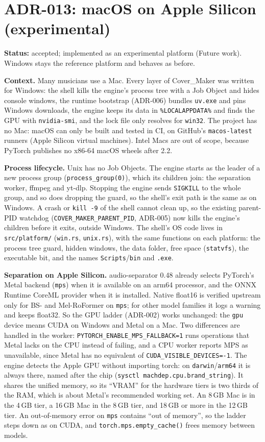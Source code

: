 \section{ADR-013: macOS on Apple Silicon (experimental)}
\textbf{Status:} accepted; implemented as an experimental platform (Future
work). Windows stays the reference platform and behaves as before.

\textbf{Context.} Many musicians use a Mac. Every layer of Cover\_Maker was
written for Windows: the shell kills the engine's process tree with a Job
Object and hides console windows, the runtime bootstrap (ADR-006) bundles
\texttt{uv.exe} and pins Windows downloads, the engine keeps its data in
\texttt{\%LOCALAPPDATA\%} and finds the GPU with \texttt{nvidia-smi}, and the
lock file only resolves for \texttt{win32}. The project has no Mac: macOS can
only be built and tested in CI, on GitHub's \texttt{macos-latest} runners
(Apple Silicon virtual machines). Intel Macs are out of scope, because
PyTorch publishes no x86-64 macOS wheels after 2.2.

\textbf{Process lifecycle.} Unix has no Job Objects. The engine starts as
the leader of a new process group (\texttt{process\_group(0)}), which its
children join: the separation worker, ffmpeg and yt-dlp. Stopping the engine
sends \texttt{SIGKILL} to the whole group, and so does dropping the guard,
so the shell's exit path is the same as on Windows. A crash or
\texttt{kill -9} of the shell cannot clean up, so the existing parent-PID
watchdog (\texttt{COVER\_MAKER\_PARENT\_PID}, ADR-005) now kills the
engine's children before it exits, outside Windows. The shell's OS code lives
in \texttt{src/platform/} (\texttt{win.rs}, \texttt{unix.rs}), with the same
functions on each platform: the process tree guard, hidden windows, the data
folder, free space (\texttt{statvfs}), the executable bit, and the names
\texttt{Scripts}/\texttt{bin} and \texttt{.exe}.

\textbf{Separation on Apple Silicon.} audio-separator 0.48 already selects
PyTorch's Metal backend (\texttt{mps}) when it is available on an arm64
processor, and the ONNX Runtime CoreML provider when it is installed.
Native float16 is verified upstream only for BS- and Mel-RoFormer on
\texttt{mps}; for other model families it logs a warning and keeps float32.
So the GPU ladder (ADR-002) works unchanged: the \texttt{gpu} device means
CUDA on Windows and Metal on a Mac. Two differences are handled in the worker:
\texttt{PYTORCH\_ENABLE\_MPS\_FALLBACK=1} runs operations that Metal lacks
on the CPU instead of failing, and a CPU worker reports MPS as unavailable,
since Metal has no equivalent of \texttt{CUDA\_VISIBLE\_DEVICES=-1}. The
engine detects the Apple GPU without importing torch: on
\texttt{darwin}/\texttt{arm64} it is always there, named after the chip
(\texttt{sysctl machdep.cpu.brand\_string}). It shares the unified memory,
so its ``VRAM'' for the hardware tiers is two thirds of the RAM, which is
about Metal's recommended working set. An 8\,GB Mac is in the 4\,GB tier, a
16\,GB Mac in the 8\,GB tier, and 18\,GB or more in the 12\,GB tier. An
out-of-memory error on \texttt{mps} contains ``out of memory'', so the ladder
steps down as on CUDA, and \texttt{torch.mps.empty\_cache()} frees memory
between models.

